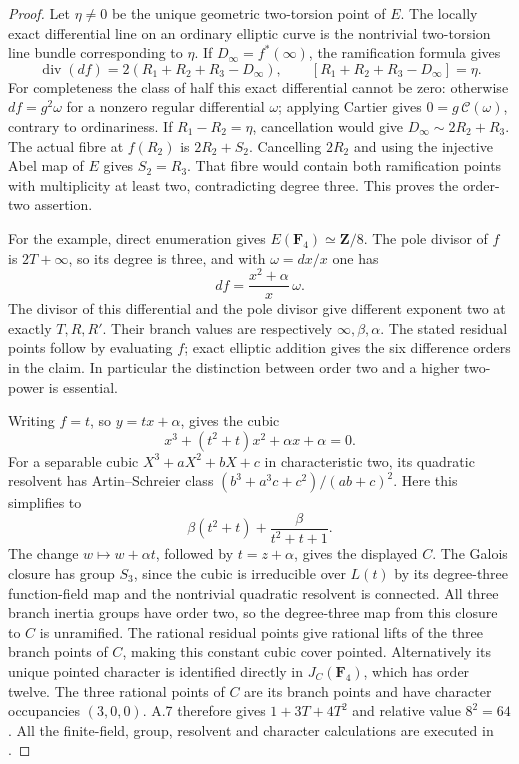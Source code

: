 \documentclass[11pt]{article}
\begin{document}
\begin{proof}
Let \(\eta\ne0\) be the unique geometric two-torsion point of
\(E\). The locally exact differential line on an ordinary
elliptic curve is the nontrivial two-torsion line bundle
corresponding to \(\eta\).
If \(D_\infty=f^*(\infty)\), the ramification formula gives
\[
 \operatorname{div}(df)
        =2(R_1+R_2+R_3-D_\infty),\qquad
 [R_1+R_2+R_3-D_\infty]=\eta.
\]
For completeness the class of half this exact differential
cannot be zero: otherwise \(df=g^2\omega\) for a nonzero
regular differential \(\omega\); applying Cartier gives
\(0=g\,\mathcal C(\omega)\), contrary to ordinariness.
If \(R_1-R_2=\eta\), cancellation would give
\(D_\infty\sim2R_2+R_3\).
The actual fibre at \(f(R_2)\) is \(2R_2+S_2\).
Cancelling \(2R_2\) and using the injective Abel map of \(E\)
gives \(S_2=R_3\). That fibre would contain both ramification
points with multiplicity at least two, contradicting degree
three. This proves the order-two assertion.

For the example, direct enumeration gives
\(E(\mathbf F_4)\simeq\mathbf Z/8\).
The pole divisor of \(f\) is \(2T+\infty\), so its degree is
three, and with \(\omega=dx/x\) one has
\[
                        df=\frac{x^2+\alpha}{x}\,\omega.
\]
The divisor of this differential and the pole divisor give
different exponent two at exactly \(T,R,R'\).
Their branch values are respectively \(\infty,\beta,\alpha\).
The stated residual points follow by evaluating \(f\);
exact elliptic addition gives the six difference orders in
the claim. In particular the distinction between order two
and a higher two-power is essential.

Writing \(f=t\), so \(y=tx+\alpha\), gives the cubic
\[
                x^3+(t^2+t)x^2+\alpha x+\alpha=0.
\]
For a separable cubic \(X^3+aX^2+bX+c\) in characteristic two,
its quadratic resolvent has Artin--Schreier class
\((b^3+a^3c+c^2)/(ab+c)^2\).
Here this simplifies to
\[
              \beta(t^2+t)+\frac{\beta}{t^2+t+1}.
\]
The change \(w\mapsto w+\alpha t\), followed by \(t=z+\alpha\),
gives the displayed \(C\).
The Galois closure has group \(S_3\), since the cubic is
irreducible over \(L(t)\) by its degree-three function-field
map and the nontrivial quadratic resolvent is connected.
All three branch inertia groups have order two, so the
degree-three map from this closure to \(C\) is unramified.
The rational residual points give rational lifts of the three
branch points of \(C\), making this constant cubic cover
pointed. Alternatively its unique pointed character is
identified directly in \(J_C(\mathbf F_4)\), which has order
twelve. The three rational points of \(C\) are its branch
points and have character occupancies \((3,0,0)\).
A.7 therefore gives \(1+3T+4T^2\) and relative value
\(8^2=64\). All the finite-field, group, resolvent and
character calculations are executed in
.


\end{proof}
\end{document}
